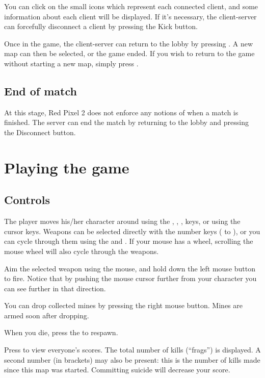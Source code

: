 \documentclass[a4paper]{article}
\begin{document}
You can click on the small icons which represent each connected
client, and some information about each client will be displayed.  If
it's necessary, the client-server can forcefully disconnect a client
by pressing the \textsf{Kick} button.

Once in the game, the client-server can return to the lobby by
pressing .  A new map can then be selected, or the game
ended.  If you wish to return to the game without starting a new map,
simply press .


\subsection{End of match}

At this stage, Red Pixel 2 does not enforce any notions of when a
match is finished.  The server can end the match by returning to the
lobby and pressing the \textsf{Disconnect} button.



\section{Playing the game}


\subsection{Controls}

The player moves his/her character around using the , ,
,  keys, or using the cursor keys.  Weapons can be
selected directly with the number keys ( to ), or you
can cycle through them using the  and .  If your mouse
has a wheel, scrolling the mouse wheel will also cycle through the
weapons.

Aim the selected weapon using the mouse, and hold down the left mouse
button to fire.  Notice that by pushing the mouse cursor further from
your character you can see further in that direction.

You can drop collected mines by pressing the right mouse button.
Mines are armed soon after dropping.

When you die, press the  to respawn.

Press  to view everyone's scores.  The total number of kills
(``frags'') is displayed.  A second number (in brackets) may also be
present: this is the number of kills made since this map was started.
Committing suicide will decrease your score.
\end{document}
